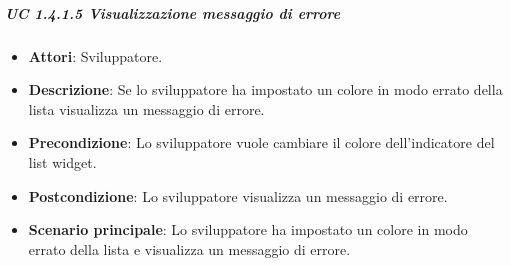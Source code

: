 \subparagraph{UC 1.4.1.5 Visualizzazione messaggio di errore}

\FloatBarrier
\begin{itemize}
\item\textbf{Attori}: Sviluppatore.
\item\textbf{Descrizione}: Se lo sviluppatore ha impostato un colore in modo errato della lista visualizza un messaggio di errore.
\item\textbf{Precondizione}: Lo sviluppatore vuole cambiare il colore dell'indicatore del list widget.
\item\textbf{Postcondizione}: Lo sviluppatore visualizza un messaggio di errore.
\item\textbf{Scenario principale}: Lo sviluppatore ha impostato un colore in modo errato della lista e visualizza un messaggio di errore.
\end{itemize}